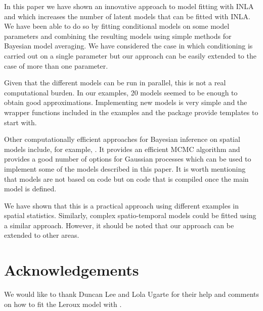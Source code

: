 \documentclass[article]{jss}
\begin{document}
In this paper we have shown an innovative approach to model fitting with INLA
and  which increases the number of latent models that can be fitted
with INLA. We have been able to do so by fitting conditional models on some
model parameters and combining the resulting models using simple methods for
Bayesian model averaging. We have considered the case in which conditioning is
carried out on a single parameter but our approach can be easily extended to the
case of more than one parameter.

Given that the different models can be run in parallel, this is not a real
computational burden. In our examples, 20 models seemed to be enough to obtain
good approximations. Implementing new models is very simple and the wrapper
functions included in the examples and the  package provide
templates to start with.

Other computationally efficient approaches for Bayesian inference on spatial 
models include, for example,  \citep{stan-software:2013}.
It provides an efficient MCMC algorithm and provides a good number of options
for Gaussian processes which can be used to implement some of the models
described in this paper. It is worth mentioning that  models are not
based on  code but on  code that is compiled once the main
model is defined.

We have shown that this is a practical approach using different examples in
spatial statistics. Similarly, complex spatio-temporal models could be fitted
using a similar approach. However, it should be noted that our approach can be
extended to other areas.

\section*{Acknowledgements}

We would like to thank Duncan Lee and Lola Ugarte for their help and comments
on how to fit the Leroux model with .



\end{document}
